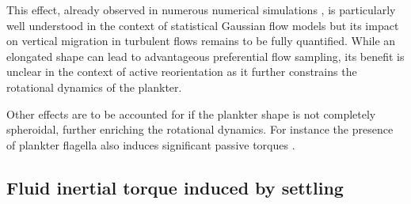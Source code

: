 This effect, already observed in numerous numerical simulations \citep{gustavsson2016preferential, borgnino2018gyrotactic}, is particularly well understood in the context of statistical Gaussian flow models \citep{gustavsson2016preferential} but its impact on vertical migration in turbulent flows remains to be fully quantified.
While an elongated shape can lead to advantageous preferential flow sampling, its benefit is unclear in the context of active reorientation as it further constrains the rotational dynamics of the plankter.

Other effects are to be accounted for if the plankter shape is not completely spheroidal, further enriching the rotational dynamics.
For instance the presence of plankter flagella also induces significant passive torques \citep{kage2020shape}.

\subsection{Fluid inertial torque induced by settling}

